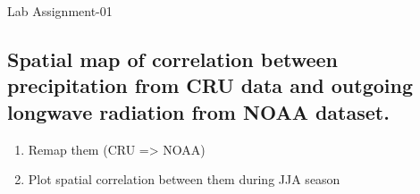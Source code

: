 \documentclass[10pt, a4paper]{article}
\begin{document}
\newpage
Lab Assignment-01
\vspace{0.25cm}
\subsection*{Spatial map of correlation between precipitation from CRU data and outgoing longwave radiation from NOAA dataset.}

\begin{Problem}
    \begin{enumerate}
        \item Remap them (CRU => NOAA)
        \item Plot spatial correlation between them during JJA season
    \end{enumerate}
\end{Problem}
\end{document}
